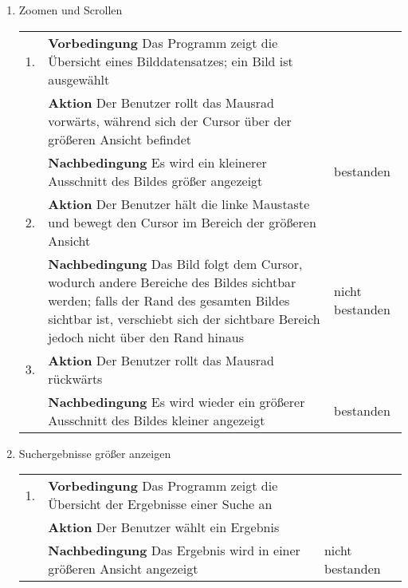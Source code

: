 \begin{enumerate} [label=\bfseries /TSW \arabic*0/, leftmargin=*]
	\item Zoomen und Scrollen \newline \newline
	\begin{tabular}{rp{4in}|l}
	1. & \textbf{Vorbedingung} Das Programm zeigt die Übersicht eines Bilddatensatzes; ein Bild ist ausgewählt & \\
	   & \textbf{Aktion} Der Benutzer rollt das Mausrad vorwärts, während sich der Cursor über der größeren Ansicht befindet & \\
	   & \textbf{Nachbedingung} Es wird ein kleinerer Ausschnitt des Bildes größer angezeigt & bestanden \\
	\hline
	2. & \textbf{Aktion} Der Benutzer hält die linke Maustaste und bewegt den Cursor im Bereich der größeren Ansicht & \\
	   & \textbf{Nachbedingung} Das Bild folgt dem Cursor, wodurch andere Bereiche des Bildes sichtbar werden; falls der Rand des gesamten Bildes sichtbar ist, verschiebt sich der sichtbare Bereich jedoch nicht über den Rand hinaus & nicht bestanden \\
	\hline
	3. & \textbf{Aktion} Der Benutzer rollt das Mausrad rückwärts & \\
	   & \textbf{Nachbedingung} Es wird wieder ein größerer Ausschnitt des Bildes kleiner angezeigt & bestanden \\
	\end{tabular}
	\newline

	\item Suchergebnisse größer anzeigen \newline \newline
	\begin{tabular}{rp{4in}|l}
	1. & \textbf{Vorbedingung} Das Programm zeigt die Übersicht der Ergebnisse einer Suche an & \\
	   & \textbf{Aktion} Der Benutzer wählt ein Ergebnis & \\
	   & \textbf{Nachbedingung} Das Ergebnis wird in einer größeren Ansicht angezeigt & nicht bestanden \\
	\end{tabular}
	\pagebreak


\end{enumerate}
